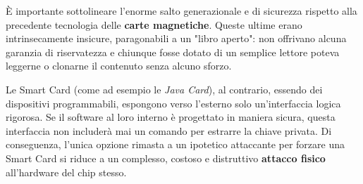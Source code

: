 È importante sottolineare l'enorme salto generazionale e di sicurezza rispetto alla precedente tecnologia delle \textbf{carte magnetiche}. Queste ultime erano intrinsecamente insicure, paragonabili a un "libro aperto": non offrivano alcuna garanzia di riservatezza e chiunque fosse dotato di un semplice lettore poteva leggerne o clonarne il contenuto senza alcuno sforzo. 

Le Smart Card (come ad esempio le \textit{Java Card}), al contrario, essendo dei dispositivi programmabili, espongono verso l'esterno solo un'interfaccia logica rigorosa. Se il software al loro interno è progettato in maniera sicura, questa interfaccia non includerà mai un comando per estrarre la chiave privata. Di conseguenza, l'unica opzione rimasta a un ipotetico attaccante per forzare una Smart Card si riduce a un complesso, costoso e distruttivo \textbf{attacco fisico} all'hardware del chip stesso.